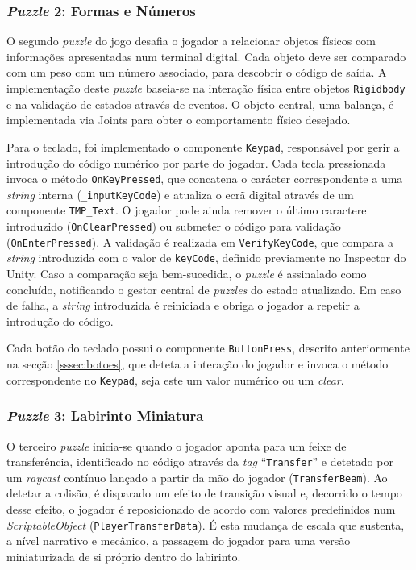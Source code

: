 \documentclass[a4paper, 12pt]{book}
\begin{document}
\subsubsection{\textit{Puzzle} 2: Formas e Números}
O segundo \textit{puzzle} do jogo desafia o jogador a relacionar objetos físicos com informações apresentadas num terminal digital. 
Cada objeto deve ser comparado com um peso com um número associado, para descobrir o código de saída.
A implementação deste \textit{puzzle} baseia-se na interação física entre objetos \texttt{Rigidbody} e na validação de estados através de eventos.
O objeto central, uma balança, é implementada via Joints para obter o comportamento físico desejado. 

Para o teclado, foi implementado o componente \texttt{Keypad}, responsável por gerir a introdução do código numérico por 
parte do jogador. Cada tecla pressionada invoca o método \texttt{OnKeyPressed}, que concatena o carácter correspondente a 
uma \textit{string} interna (\texttt{\_inputKeyCode}) e atualiza o ecrã digital através de um componente \texttt{TMP\_Text}. 
O jogador pode ainda remover o último caractere introduzido (\texttt{OnClearPressed}) ou submeter o código 
para validação (\texttt{OnEnterPressed}).
A validação é realizada em \texttt{VerifyKeyCode}, que compara a \textit{string} introduzida com o valor de \texttt{keyCode}, 
definido previamente no Inspector do Unity. Caso a comparação seja bem-sucedida, o \textit{puzzle} é assinalado como concluído,
 notificando o gestor central de \textit{puzzles} do estado atualizado. 
Em caso de falha, a \textit{string} introduzida é reiniciada e obriga o jogador a repetir a introdução do código.

Cada botão do teclado possui o componente \texttt{ButtonPress}, descrito anteriormente na secção \ref{sssec:botoes}, que deteta a interação 
do jogador 
e invoca o método correspondente no \texttt{Keypad}, seja este um valor numérico ou um \textit{clear}.

\subsubsection{\textit{Puzzle} 3: Labirinto Miniatura}
O terceiro \textit{puzzle} inicia-se quando o jogador aponta para um feixe de 
transferência, identificado no código através da \textit{tag} 
``\texttt{Transfer}'' e detetado por um \textit{raycast} contínuo lançado a 
partir da mão do jogador (\texttt{TransferBeam}). Ao detetar a colisão, é 
disparado um efeito de transição visual e, decorrido o tempo desse efeito, o 
jogador é reposicionado de acordo com 
valores predefinidos num \textit{ScriptableObject} (\texttt{PlayerTransferData}). 
É esta mudança de escala que sustenta, a nível narrativo e mecânico, a 
passagem do jogador para uma versão miniaturizada de si 
próprio dentro do labirinto.
\end{document}
